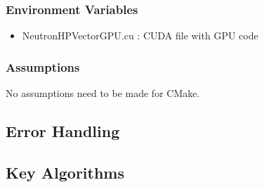 \documentclass[12pt]{article}
\begin{document}
\subsubsection{Environment Variables}%
\begin{itemize}
\item NeutronHPVectorGPU.cu : CUDA file with GPU code
\end{itemize}


\subsubsection{Assumptions}%
No assumptions need to be made for CMake.

\subsection{Error Handling}

\subsection{Key Algorithms}
\end{document}

